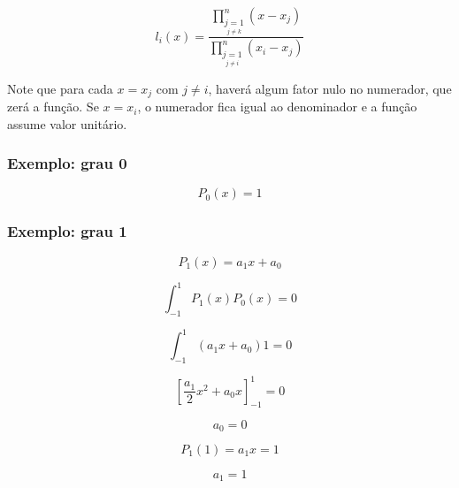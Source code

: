         \begin{equation}
            l_i(x) =
            \frac{\prod_{\underset{j \neq k}{j=1}}^n \left(x-x_j\right)}{\prod_{\underset{j \neq i}{j=1}}^n \left(x_i-x_j\right)}
        \end{equation}

        Note que para cada $x=x_j$ com $j\neq i$, haverá algum fator nulo no numerador, que zerá a função. Se $x=x_i$, o numerador fica igual ao denominador e a função assume valor unitário.
    

        \subsubsection*{Exemplo: grau 0}

        \begin{equation*}
            P_0(x) = 1
        \end{equation*}

        \subsubsection*{Exemplo: grau 1}

        \begin{equation*}
            P_1(x) = a_1x + a_0
        \end{equation*}

        \begin{equation*}
            \int_{-1}^{1} P_1(x) P_0(x) = 0
        \end{equation*}

        \begin{equation*}
            \int_{-1}^{1} \left( a_1x + a_0\right) 1 = 0
        \end{equation*}

        \begin{equation*}
            \left[ \frac{a_1}{2}x^2 + a_0 x\right]_{-1}^1 = 0
        \end{equation*}

        \begin{equation*}
            a_0 = 0
        \end{equation*}

        \begin{equation*}
            P_1(1) = a_1 x = 1
        \end{equation*}

        \begin{equation*}
            a_1= 1
        \end{equation*}


